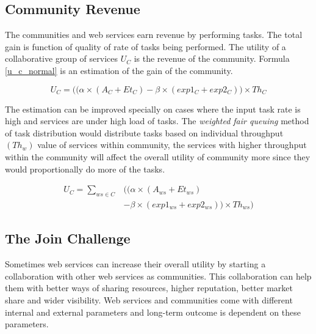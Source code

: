 \documentclass[10pt,journal,cspaper,compsoc]{IEEEtran}
\begin{document}
\subsection{Community Revenue}

The communities and web services earn revenue by performing tasks. The total gain is function of quality of rate of tasks being performed. The utility of a collaborative group of services $U_{C}$ is the revenue of the community. Formula \ref{u_c_normal} is an estimation of the gain of the community.

\begin{equation}\label{u_c_normal}
U_{C} = \big((\alpha \times (A_{C} + Et_{C}) - \beta \times (exp1_{C} + exp2_{C})\big) \times Th_{C}
\end{equation}

The estimation can be improved specially on cases where the input task rate is high and services are under high load of tasks. The \emph{weighted fair queuing} method of task distribution would distribute tasks based on individual throughput $(Th_{w})$ value of services within community, the services with higher throughput within the community will affect the overall utility of community more since they would proportionally do more of the tasks.

\begin{equation}\label{u_c_load}
\begin{split}
U_{C} = \sum_{ws \in C}&\bigg(\big(\alpha \times (A_{ws} + Et_{ws}) \\
        & - \beta \times (exp1_{ws} + exp2_{ws})\big) \times Th_{ws}\bigg)
\end{split}
\end{equation}

\subsection{The Join Challenge}\label{s:tjc}
Sometimes web services can increase their overall utility by starting a collaboration with other web services as communities. This collaboration can help them with better ways of sharing resources, higher reputation, better market share and wider visibility. Web services and communities come with different internal and external parameters and long-term outcome is dependent on these parameters. 
\end{document}
